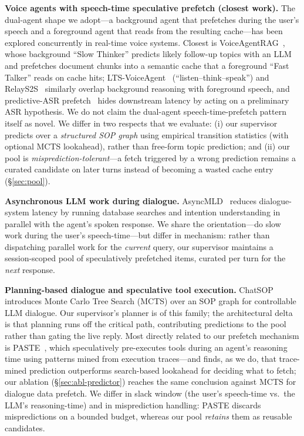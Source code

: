 \documentclass[10pt,twocolumn]{article}
\begin{document}
\textbf{Voice agents with speech-time speculative prefetch (closest work).} The dual-agent shape we adopt---a background agent that prefetches during the user's speech and a foreground agent that reads from the resulting cache---has been explored concurrently in real-time voice systems. Closest is VoiceAgentRAG~\cite{voiceagentrag2026}, whose background ``Slow Thinker'' predicts likely follow-up topics with an LLM and prefetches document chunks into a semantic cache that a foreground ``Fast Talker'' reads on cache hits; LTS-VoiceAgent~\cite{lts2026} (``listen--think--speak'') and RelayS2S~\cite{relays2s2026} similarly overlap background reasoning with foreground speech, and predictive-ASR prefetch~\cite{predasr2023} hides downstream latency by acting on a preliminary ASR hypothesis. We do not claim the dual-agent speech-time-prefetch pattern itself as novel. We differ in two respects that we evaluate: (i) our supervisor predicts over a \emph{structured SOP graph} using empirical transition statistics (with optional MCTS lookahead), rather than free-form topic prediction; and (ii) our pool is \emph{misprediction-tolerant}---a fetch triggered by a wrong prediction remains a curated candidate on later turns instead of becoming a wasted cache entry (\S\ref{sec:pool}).

\textbf{Asynchronous LLM work during dialogue.} AsyncMLD~\cite{asyncmld2023} reduces dialogue-system latency by running database searches and intention understanding in parallel with the agent's spoken response. We share the orientation---do slow work during the user's speech-time---but differ in mechanism: rather than dispatching parallel work for the \emph{current} query, our supervisor maintains a session-scoped pool of speculatively prefetched items, curated per turn for the \emph{next} response.

\textbf{Planning-based dialogue and speculative tool execution.} ChatSOP~\cite{chatsop2024} introduces Monte Carlo Tree Search (MCTS) over an SOP graph for controllable LLM dialogue. Our supervisor's planner is of this family; the architectural delta is that planning runs off the critical path, contributing predictions to the pool rather than gating the live reply. Most directly related to our prefetch mechanism is PASTE~\cite{paste2026}, which speculatively pre-executes tools during an agent's reasoning time using patterns mined from execution traces---and finds, as we do, that trace-mined prediction outperforms search-based lookahead for deciding what to fetch; our ablation (\S\ref{sec:abl-predictor}) reaches the same conclusion against MCTS for dialogue data prefetch. We differ in slack window (the user's speech-time vs.\ the LLM's reasoning-time) and in misprediction handling: PASTE discards mispredictions on a bounded budget, whereas our pool \emph{retains} them as reusable candidates.
\end{document}
